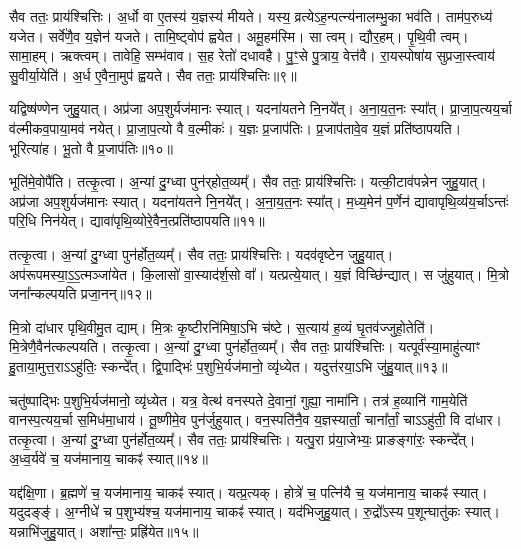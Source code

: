 सैव ततः॒ प्राय॑श्चित्तिः।
अ॒र्धो वा ए॒तस्य॑ य॒ज्ञस्य॑ मीयते।
यस्य॒ व्रत्ये\-ऽह॒न्पत्न्य॑नालम्भु॒का भव॑ति।
ताम॑प॒रुध्य॑ यजेत।
सर्वे॑णै॒व य॒ज्ञेन॑ यजते।
तामि॒ष्ट्वोप॑ ह्वयेत।
अमू॒हम॑स्मि।
सा त्वम्।
द्यौर॒हम्।
पृ॒थि॒वी त्वम्।
सामा॒हम्।
ऋक्त्वम्।
तावेहि॒ सम्भ॑वाव।
स॒ह रेतो॑ दधावहै।
पु॒ꣳ॒से पु॒त्राय॒ वेत्त॑वै।
रा॒यस्पोषा॑य सुप्रजा॒स्त्वाय॑ सु॒वीर्या॒येति॑।
अ॒र्ध ए॒वैना॒मुप॑ ह्वयते।
सैव ततः॒ प्राय॑श्चित्तिः॥९॥\anuvakamend[द॒धा॒ति॒ य॒ज्ञ उ॑त॒ एक॒न्धय॑न्ति रुन्धे कुर्यादा॒र्च्छत्य॒पाकु॑र्यात्पृथि॒वी त्वम॒ष्टौ च॑ (सर्वा॒न्॒ वि वै यदि॑ परस्त॒रामोष॑धीरन्यत॒रानु॒भया॑न॒र्धो वै॥)]

यद्विष्ष॑ण्णेन जुहु॒यात्।
अप्र॑जा अप॒शुर्यज॑मानः स्यात्।
यदना॑यतने नि॒नये᳚त्।
अ॒ना॒य॒त॒नः स्या᳚त्।
प्रा॒जा॒प॒त्यय॒र्चा व॑ल्मीकव॒पाया॒मव॑ नयेत्।
प्रा॒जा॒प॒त्यो वै व॒ल्मीकः॑।
य॒ज्ञः प्र॒जाप॑तिः।
प्र॒जाप॑तावे॒व य॒ज्ञं प्रति॑\-ष्ठापयति।
भूरित्या॑ह।
भू॒तो वै प्र॒जाप॑तिः॥१०॥

भूति॑मे॒वोपै॑ति।
तत्कृ॒त्वा।
अ॒न्यां दु॒ग्ध्वा पुन॑र्‌\mbox{}होत॒व्यम्᳚।
सैव ततः॒ प्राय॑श्चित्तिः।
यत्की॒टाव॑पन्नेन जुहु॒यात्।
अप्र॑जा अप॒शुर्यज॑मानः स्यात्।
यदना॑यतने नि॒नये᳚त्।
अ॒ना॒य॒त॒नः स्या᳚त्।
म॒ध्य॒मेन॑ प॒र्णेन॑ द्यावापृथि॒व्य॑य॒र्चा\-ऽन्तः॑ परि॒धि निन॑येत्।
द्यावा॑पृथि॒व्योरे॒वैन॒त्प्रति॑\-ष्ठापयति॥११॥

तत्कृ॒त्वा।
अ॒न्यां दु॒ग्ध्वा पुन॑र्\mbox{}होत॒व्यम्᳚।
सैव ततः॒ प्राय॑श्चित्तिः।
यदव॑वृष्टेन जुहु॒यात्।
अप॑रूपमस्या॒ऽ॒ऽ॒त्मञ्जा॑येत।
कि॒लासो॑ वा॒स्याद॑र्\mbox{}श॒सो वा᳚।
यत्प्रत्ये॒यात्।
य॒ज्ञं विच्छि॑न्द्यात्।
स जु॑हुयात्।
मि॒त्रो जना᳚न्कल्पयति प्रजा॒नन्॥१२॥

मि॒त्रो दा॑धार पृथि॒वीमु॒त द्याम्।
मि॒त्रः कृ॒ष्टीरनि॑मिषा॒ऽभि च॑ष्टे।
स॒त्याय॑ ह॒व्यं घृ॒तव॑ज्जुहो॒तेति॑।
मि॒त्रेणै॒वैन॑त्कल्पयति।
तत्कृ॒त्वा।
अ॒न्यां दु॒ग्ध्वा पुन॑र्\mbox{}होत॒व्यम्᳚।
सैव ततः॒ प्राय॑श्चित्तिः।
यत्पूर्व॑स्या॒माहु॑त्याꣳ हु॒ताया॒मुत्त॒रा\-ऽऽहु॑तिः॒ स्कन्दे᳚त्।
द्वि॒पाद्भिः॑ प॒शुभि॒र्यज॑मानो॒ व्यृ॑ध्येत।
यदुत्त॑रया॒ऽभि जु॑हु॒यात्॥१३॥

चतु॑ष्पाद्भिः प॒शुभि॒र्यज॑मानो॒ व्यृ॑ध्येत।
यत्र॒ वेत्थ॑ वनस्पते दे॒वानां॒ गुह्या॒ नामा॑नि।
तत्र॑ ह॒व्यानि॑ गाम॒येति॑ वानस्प॒त्यय॒र्चा स॒मिध॑मा॒धाय॑।
तू॒ष्णीमे॒व पुन॑र्जुहुयात्।
वन॒स्पति॑नै॒व य॒ज्ञस्यार्तां॒ चाना᳚र्तां॒ चाऽऽहु॑ती॒ वि दा॑धार।
तत्कृ॒त्वा।
अ॒न्यां दु॒ग्ध्वा पुन॑र्\mbox{}होत॒व्यम्᳚।
सैव ततः॒ प्राय॑श्चित्तिः।
यत्पु॒रा प्र॑या॒जेभ्यः॒ प्राङङ्गा॑रः॒ स्कन्दे᳚त्।
अ॒ध्व॒र्यवे॑ च॒ यज॑मानाय॒ चाकꣴ॑ स्यात्॥१४॥

यद्द॑क्षि॒णा।
ब्र॒ह्मणे॑ च॒ यज॑मानाय॒ चाकꣴ॑ स्यात्।
यत्प्र॒त्यक्।
होत्रे॑ च॒ पत्नि॑यै च॒ यज॑मानाय॒ चाकꣴ॑ स्यात्।
यदुदङ्ङ्॑।
अ॒ग्नीधे॑ च प॒शुभ्य॑श्च॒ यज॑मानाय॒ चाकꣴ॑ स्यात्।
यद॑भिजुहु॒यात्।
रु॒द्रो᳚ऽस्य प॒शून्घातु॑कः स्यात्।
यन्नाभि॑जुहु॒यात्।
अशा᳚न्तः॒ प्रह्रि॑येत॥१५॥

